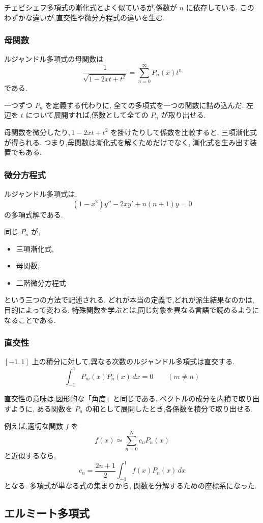 チェビシェフ多項式の漸化式とよく似ているが,係数が $n$ に依存している.
このわずかな違いが,直交性や微分方程式の違いを生む.

\subsubsection{母関数}

ルジャンドル多項式の母関数は
\[
  \frac1{\sqrt{1-2xt+t^2}}
  =\sum_{n=0}^{\infty}P_n(x)t^n
\]
である.

一つずつ $P_n$ を定義する代わりに,
全ての多項式を一つの関数に詰め込んだ.
左辺を $t$ について展開すれば,係数として全ての $P_n$ が取り出せる.

母関数を微分したり,\,$1-2xt+t^2$ を掛けたりして係数を比較すると,
三項漸化式が得られる.
つまり,母関数は漸化式を解くためだけでなく,
漸化式を生み出す装置でもある.

\subsubsection{微分方程式}

ルジャンドル多項式は,
\[
  (1-x^2)y''-2xy'+n(n+1)y=0
\]
の多項式解である.

同じ $P_n$ が,
\begin{itemize}
  \item 三項漸化式,
  \item 母関数,
  \item 二階微分方程式
\end{itemize}
という三つの方法で記述される.
どれが本当の定義で,どれが派生結果なのかは,目的によって変わる.
特殊関数を学ぶとは,同じ対象を異なる言語で読めるようになることである.

\subsubsection{直交性}

$[-1,1]$ 上の積分に対して,異なる次数のルジャンドル多項式は直交する.
\[
  \int_{-1}^{1}P_m(x)P_n(x)\,dx=0
  \qquad(m\neq n)
\]

直交性の意味は,図形的な「角度」と同じである.
ベクトルの成分を内積で取り出すように,
ある関数を $P_n$ の和として展開したとき,各係数を積分で取り出せる.

例えば,適切な関数 $f$ を
\[
  f(x)\simeq\sum_{n=0}^{N}c_nP_n(x)
\]
と近似するなら,
\[
  c_n=
  \frac{2n+1}{2}
  \int_{-1}^{1}f(x)P_n(x)\,dx
\]
となる.
多項式が単なる式の集まりから,
関数を分解するための座標系になった.

\subsection{エルミート多項式}

